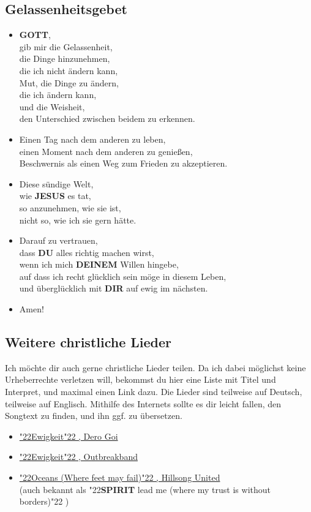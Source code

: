 \documentclass[12pt,a5paper]{article}
\newcommand{\Deinem}[0]{\textbf{DEINEM}}
\newcommand{\Dir}[0]{\textbf{DIR}}
\newcommand{\Du}[0]{\textbf{DU}}
\newcommand{\Gott}[0]{\textbf{GOTT}}
\newcommand{\Jesus}[0]{\textbf{JESUS}}
\newcommand{\Spirit}[0]{\textbf{SPIRIT}}
\newcommand{\q}[1]{\char"22{#1}\char"22 }
\begin{document}
	\subsection{Gelassenheitsgebet}
		\begin{itemize}[nosep]
			\item	{\Gott},
			\\		gib mir die Gelassenheit,
			\\		die Dinge hinzunehmen,
			\\		die ich nicht \"andern kann,
			\\		Mut,
					die Dinge zu \"andern,
			\\		die ich \"andern kann,
			\\		und die Weisheit,
			\\		den Unterschied zwischen beidem zu erkennen.
			\item	Einen Tag nach dem anderen zu leben,
			\\		einen Moment nach dem anderen zu genie{\ss}en,
			\\		Beschwernis als einen Weg zum Frieden zu akzeptieren.
			\item	Diese s\"undige Welt,
			\\		wie {\Jesus} es tat,
			\\		so anzunehmen,
					wie sie ist,
			\\		nicht so, wie ich sie gern h\"atte.
			\item	Darauf zu vertrauen,
			\\		dass {\Du} alles richtig machen wirst,
			\\		wenn ich mich {\Deinem} Willen hingebe,
			\\		auf dass ich recht gl\"ucklich sein m\"oge in diesem Leben,
			\\		und \"ubergl\"ucklich mit {\Dir} auf ewig im n\"achsten.
			\item	Amen!			
		\end{itemize}

	\subsection{Weitere christliche Lieder}
		Ich m\"ochte dir auch gerne christliche Lieder teilen.
		Da ich dabei m\"oglichst keine Urheberrechte verletzen will,
		bekommst du hier eine Liste mit Titel und Interpret,
		und maximal einen Link dazu.
		Die Lieder sind teilweise auf Deutsch,
		teilweise auf Englisch.
		Mithilfe des Internets sollte es dir leicht fallen,
		den Songtext zu finden,
		und ihn ggf. zu \"ubersetzen.
		\begin{itemize}[noitemsep]
			\item	\href{https://www.youtube.com/watch?v=Oncj9JBo1xQ}{\q{Ewigkeit},
					Dero Goi}
			\item	\href{https://www.youtube.com/watch?v=PcxaUHkmnSQ}{\q{Ewigkeit},
					Outbreakband }
			\item	\href{https://www.youtube.com/watch?v=DqlpyrHB_Qk}{\q{Oceans (Where feet may fail)},
					Hillsong United}
					\\
					(auch bekannt als \q{{\Spirit} lead me (where my trust is without borders)})
		\end{itemize}
\end{document}
